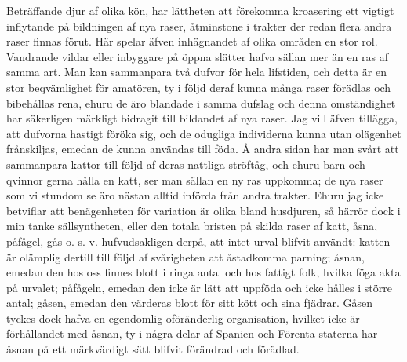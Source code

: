 Beträffande djur af olika kön, har lättheten att förekomma kroasering ett vigtigt inflytande på bildningen af nya raser, åtminstone i trakter der redan flera andra raser finnas förut. Här spelar äfven inhägnandet af olika områden en stor rol. Vandrande vildar eller inbyggare på öppna slätter hafva sällan mer än en ras af samma art. Man kan sammanpara två dufvor för hela lifstiden, och detta är en stor beqvämlighet för amatören, ty i följd deraf kunna många raser förädlas och bibehållas rena, ehuru de äro blandade i samma dufslag och denna omständighet har säkerligen märkligt bidragit till bildandet af nya raser. Jag vill äfven tillägga, att dufvorna hastigt föröka sig, och de odugliga individerna kunna utan olägenhet frånskiljas, emedan de kunna användas till föda. Å andra sidan har man svårt att sammanpara kattor till följd af deras nattliga ströftåg, och ehuru barn och qvinnor gerna hålla en katt, ser man sällan en ny ras uppkomma; de nya raser som vi stundom se äro nästan alltid införda från andra trakter. Ehuru jag icke betviflar att benägenheten för variation är olika bland husdjuren, så härrör dock i min tanke sällsyntheten, eller den totala bristen på skilda raser af katt, åsna, påfågel, gås o. s. v. hufvudsakligen derpå, att intet urval blifvit användt: katten är olämplig dertill till följd af svårigheten att åstadkomma parning; åsnan, emedan den hos oss finnes blott i ringa antal och hos fattigt folk, hvilka föga akta på urvalet; påfågeln, emedan den icke är lätt att uppföda och icke hålles i större antal; gåsen, emedan den värderas blott för sitt kött och sina fjädrar. Gåsen tyckes dock hafva en egendomlig oföränderlig organisation, hvilket icke är förhållandet med åsnan, ty i några delar af Spanien och Förenta staterna har åsnan på ett märkvärdigt sätt blifvit förändrad och förädlad.

